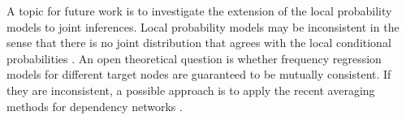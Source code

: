 \documentclass{article}
\begin{document}
A topic for future work is to investigate the extension of the local probability models to joint inferences. Local probability models may be inconsistent in the sense that there is no joint distribution that agrees with the local conditional probabilities \cite{Heckerman2000}. An open theoretical question is whether frequency regression models for different target nodes are guaranteed to be mutually consistent. If they are inconsistent, a possible approach is to apply the recent averaging methods for dependency networks \cite{Lowd2012}.

%




\end{document}
